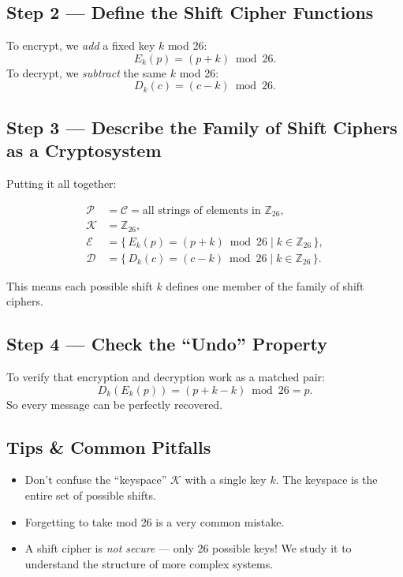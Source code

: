 \documentclass[12pt]{article}
\begin{document}
\subsection*{Step 2 — Define the Shift Cipher Functions}
To encrypt, we \emph{add} a fixed key $k$ mod 26:
\[
E_k(p) = (p + k) \bmod 26.
\]
To decrypt, we \emph{subtract} the same $k$ mod 26:
\[
D_k(c) = (c - k) \bmod 26.
\]

\subsection*{Step 3 — Describe the Family of Shift Ciphers as a Cryptosystem}
Putting it all together:

\[
\begin{aligned}
\mathcal{P} &= \mathcal{C} = \text{all strings of elements in } \mathbb{Z}_{26}, \\
\mathcal{K} &= \mathbb{Z}_{26}, \\
\mathcal{E} &= \{\,E_k(p) = (p + k) \bmod 26 \mid k \in \mathbb{Z}_{26}\,\}, \\
\mathcal{D} &= \{\,D_k(c) = (c - k) \bmod 26 \mid k \in \mathbb{Z}_{26}\,\}.
\end{aligned}
\]

This means each possible shift $k$ defines one member of the family of shift ciphers.

\subsection*{Step 4 — Check the “Undo” Property}
To verify that encryption and decryption work as a matched pair:
\[
D_k(E_k(p)) = (p + k - k) \bmod 26 = p.
\]
So every message can be perfectly recovered.

\subsection*{Tips \& Common Pitfalls}
\begin{itemize}[leftmargin=1.25em]
  \item Don’t confuse the “keyspace” $\mathcal{K}$ with a single key $k$. The keyspace is the entire set of possible shifts.
  \item Forgetting to take mod 26 is a very common mistake.
  \item A shift cipher is \emph{not secure} — only 26 possible keys! We study it to understand the structure of more complex systems.
\end{itemize}
\end{document}
